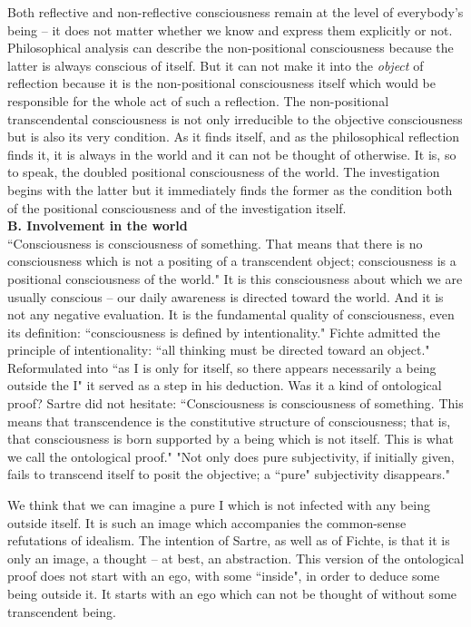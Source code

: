 Both reflective and non-reflective consciousness remain at the level of everybody's being -- it does not matter 
whether we know and express them explicitly or not. Philosophical analysis can describe the non-positional 
consciousness because the latter is always conscious of itself. But it can not make it into the {\em object} of reflection because 
it is the non-positional consciousness itself which would be responsible for the whole act of such a reflection. The 
non-positional transcendental consciousness is not only irreducible to the objective consciousness but is also its 
very condition. As it finds itself, and as the philosophical reflection finds it, it is always in the world and it can 
not be thought of otherwise. It is, so to speak, the doubled positional consciousness of the world. The 
investigation begins with the latter but it immediately finds the former as the condition both of the positional 
consciousness and of the investigation itself. \\[1ex]
{\bf B. Involvement in the world} \\
``Consciousness is consciousness of something. That means that there is no consciousness which is not a 
positing of a transcendent object; consciousness is a positional consciousness of the world." \cite{BN}   It is this 
consciousness about which we are usually conscious -- our daily awareness is directed toward the world. And it is 
not any negative evaluation. It is the fundamental quality of consciousness, even its definition: ``consciousness is 
defined by intentionality." \cite{BN}   Fichte admitted the principle of intentionality: ``all thinking must be directed toward an 
object." \cite{ITS} Reformulated into ``as I is only for itself, so there appears necessarily a being outside the I" \cite{ITS} it served as 
a step in his deduction. Was it a kind of ontological proof? Sartre did not hesitate: ``Consciousness is 
consciousness of something. This means that transcendence is the constitutive structure of consciousness; that is, 
that consciousness is born supported by a being which is not itself. This is what we call the ontological proof." 
"Not only does pure subjectivity, if initially given, fails to transcend itself to posit the objective; a ``pure" 
subjectivity disappears." \cite{BN}   

We think that we can imagine a pure I which is not infected with any being outside itself. It is such an image 
which accompanies the common-sense refutations of idealism. The intention of Sartre, as well as of Fichte, is that 
it is only an image, a thought -- at best, an abstraction. This version of the ontological proof does not start with an 
ego, with some ``inside", in order to deduce some being outside it. It starts with an ego which can not be thought 
of without some transcendent being.

